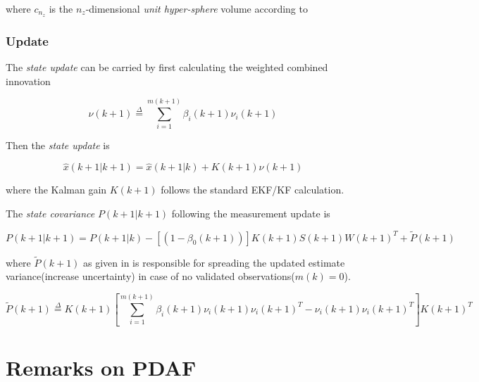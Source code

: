 where $c_{n_z}$ is the $n_z$-dimensional \emph{unit hyper-sphere} volume according to 

\subsubsection{Update}


The \emph{state update} can be carried by first calculating the weighted combined innovation



\begin{equation}\label{eq:weighted_innovation}
\nu(k+1) \overset{\Delta}{=} \sum_{i=1}^{m(k+1)}\beta_i(k+1)\nu_i(k+1)
\end{equation}


Then the \emph{state update} is

$$
\hat{x}(k+1|k+1) = \hat{x}(k+1|k) + K(k+1)\nu(k+1)
$$

where the Kalman gain $K(k+1)$ follows the standard EKF/KF calculation.

The \emph{state covariance} $P(k+1|k+1)$ following the measurement update is \cite{Kirubarajan2004}

$$
P(k+1|k+1) = P(k+1|k) -  [ (1-\beta_0(k+1)) ] K(k+1)S(k+1)W(k+1)^T + \tilde{P}(k+1)
$$

where $\tilde{P}(k+1)$ as given in  is responsible for spreading the updated estimate variance(increase uncertainty) in case of no validated observations($m(k)=0$).


\begin{equation}
\label{eq:spread}
\tilde{P}(k+1) \overset{\Delta}{=} K(k+1)\left[ \sum_{i=1}^{m(k+1)}\beta_i(k+1)\nu_i(k+1)\nu_i(k+1)^T - \nu_i(k+1)\nu_i(k+1)^T \right]K(k+1)^T
\end{equation}

\section{Remarks on PDAF}

